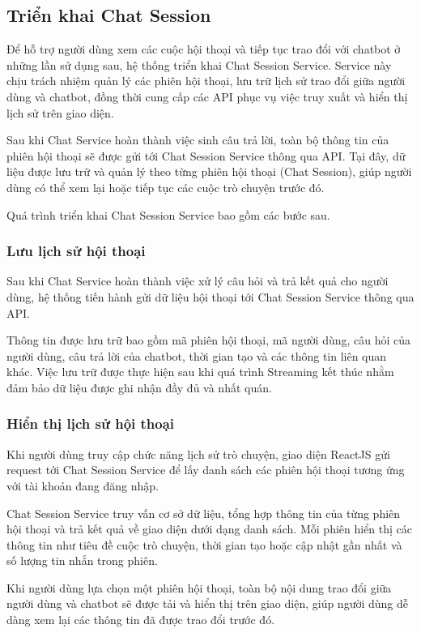 \documentclass[../DoAn.tex]{subfiles}
\begin{document}
\subsection{Triển khai Chat Session}
Để hỗ trợ người dùng xem các cuộc hội thoại và tiếp tục trao đổi với chatbot ở những lần sử dụng sau, hệ thống triển khai Chat Session Service. Service này chịu trách nhiệm quản lý các phiên hội thoại, lưu trữ lịch sử trao đổi giữa người dùng và chatbot, đồng thời cung cấp các API phục vụ việc truy xuất và hiển thị lịch sử trên giao diện.

Sau khi Chat Service hoàn thành việc sinh câu trả lời, toàn bộ thông tin của phiên hội thoại sẽ được gửi tới Chat Session Service thông qua API. Tại đây, dữ liệu được lưu trữ và quản lý theo từng phiên hội thoại (Chat Session), giúp người dùng có thể xem lại hoặc tiếp tục các cuộc trò chuyện trước đó.

Quá trình triển khai Chat Session Service bao gồm các bước sau.

\subsubsection{Lưu lịch sử hội thoại}
Sau khi Chat Service hoàn thành việc xử lý câu hỏi và trả kết quả cho người dùng, hệ thống tiến hành gửi dữ liệu hội thoại tới Chat Session Service thông qua API.

Thông tin được lưu trữ bao gồm mã phiên hội thoại, mã người dùng, câu hỏi của người dùng, câu trả lời của chatbot, thời gian tạo và các thông tin liên quan khác. Việc lưu trữ được thực hiện sau khi quá trình Streaming kết thúc nhằm đảm bảo dữ liệu được ghi nhận đầy đủ và nhất quán.

\subsubsection{Hiển thị lịch sử hội thoại}
Khi người dùng truy cập chức năng lịch sử trò chuyện, giao diện ReactJS gửi request tới Chat Session Service để lấy danh sách các phiên hội thoại tương ứng với tài khoản đang đăng nhập.

Chat Session Service truy vấn cơ sở dữ liệu, tổng hợp thông tin của từng phiên hội thoại và trả kết quả về giao diện dưới dạng danh sách. Mỗi phiên hiển thị các thông tin như tiêu đề cuộc trò chuyện, thời gian tạo hoặc cập nhật gần nhất và số lượng tin nhắn trong phiên.

Khi người dùng lựa chọn một phiên hội thoại, toàn bộ nội dung trao đổi giữa người dùng và chatbot sẽ được tải và hiển thị trên giao diện, giúp người dùng dễ dàng xem lại các thông tin đã được trao đổi trước đó.
\end{document}
